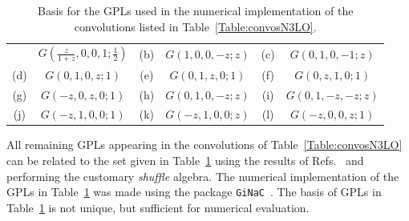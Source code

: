 \documentclass[12pt]{article}
\newcommand\f[2]{\frac{#1}{#2}}
\begin{document}
\begin{appendix}
\begin{table}
\begin{center}
\begin{tabular}{ |c|c||c|c||c|c| }
& $G(\f{z}{1+z},0,0,1;\f{1}{2})$

& \multirow{1}{*}{(b)} 

& $G(1,0,0,-z;z)$ 

& \multirow{1}{*}{(c)} 

& $G(0,1,0,-1;z)$  \\

\multirow{1}{*}{(d)} 

& $G(0,1,0,z;1)$



& \multirow{1}{*}{(e)} 

& $G(0,1,z,0;1)$  

& \multirow{1}{*}{(f)} 

& $G(0,z,1,0;1)$\\

\multirow{1}{*}{(g)} 

& $G(-z,0,z,0;1)$ 

& \multirow{1}{*}{(h)} 

& $G(0,1,0,-z;z)$  

&\multirow{1}{*}{(i)} 

& $G(0,1,-z,-z;z)$\\

 \multirow{1}{*}{(j)} 

& $G(-z,1,0,0;1)$ 

& \multirow{1}{*}{(k)} 

& $G(-z,1,0,0;z)$  

& \multirow{1}{*}{(l)} 

& $G(-z,0,0,z;1)$

\\  

\hline
\end{tabular}
\caption{\label{Table:GPLsused}
{Basis for the GPLs used in the numerical implementation of the convolutions listed in Table~\ref{Table:convosN3LO}. 
}}
\renewcommand{\arraystretch}{1}
\end{center}
\end{table}
All remaining GPLs appearing in the convolutions of Table~\ref{Table:convosN3LO} can be related to the set given in Table~\ref{Table:GPLsused} using the results of Refs.~\cite{Frellesvig:2016ske,Maitre:2005uu,Duhr:2011zq} and performing the customary \textit{shuffle} algebra. The numerical implementation of the GPLs in Table~\ref{Table:GPLsused} was made using the package \texttt{GiNaC}~\cite{Bauer:2000cp,Vollinga:2004sn}. The basis of GPLs in Table~\ref{Table:GPLsused} is not unique, but 
sufficient for  numerical evaluation.


\end{appendix}
\end{document}
